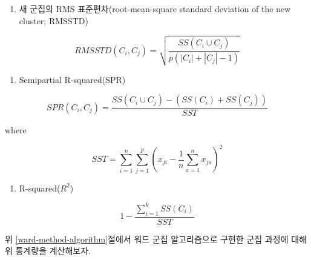 \documentclass[
]{book}
\providecommand{\tightlist}{%
  \setlength{\itemsep}{0pt}\setlength{\parskip}{0pt}}
\begin{document}
\begin{enumerate}
\def\labelenumi{\arabic{enumi}.}
\tightlist
\item
  새 군집의 RMS 표준편차(root-mean-square standard deviation of the new cluster; RMSSTD)
\end{enumerate}

\begin{equation*}
RMSSTD(C_i, C_j) = \sqrt{\frac{SS(C_i \cup C_j)}{p(|C_i| + |C_j| - 1)}}
\end{equation*}

\begin{enumerate}
\def\labelenumi{\arabic{enumi}.}
\setcounter{enumi}{1}
\tightlist
\item
  Semipartial R-squared(SPR)
\end{enumerate}

\begin{equation*}
SPR(C_i, C_j) = \frac{SS(C_i \cup C_j) - (SS(C_i) + SS(C_j))}{SST}
\end{equation*}

where

\begin{equation*}
SST = \sum_{i = 1}^{n} \sum_{j = 1}^{p} \left( x_{ji} - \frac{1}{n} \sum_{a = 1}^{n} x_{ja} \right)^2
\end{equation*}

\begin{enumerate}
\def\labelenumi{\arabic{enumi}.}
\setcounter{enumi}{2}
\tightlist
\item
  R-squared(\(R^2\))
\end{enumerate}

\begin{equation*}
1 - \frac{\sum_{i = 1}^{k} SS(C_i)}{SST}
\end{equation*}

위 \ref{ward-method-algorithm}절에서 워드 군집 알고리즘으로 구현한 군집 과정에 대해 위 통계량을 계산해보자.
\end{document}
